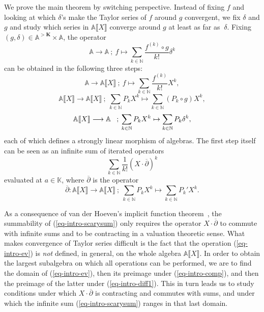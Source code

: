 \documentclass{article}
\newcommand{\of}{:}
\newcommand{\tmem}[1]{{\em #1\/}}
\theoremstyle{remark}\newtheorem*{convention*}{Convention}
\begin{document}
We prove the main theorem by switching perspective. Instead of fixing $f$ and
looking at which $\delta$'s make the Taylor series of $f$ around $g$
convergent, we fix $\delta$ and $g$ and study which series in $\mathbb{A}
\llbracket X \rrbracket$ converge around $g$ at least as far as $\: \delta$.
Fixing $(g, \delta) \in \mathbb{A}^{> \mathbf{K}} \times \mathbb{A}$, the
operator
\[ \mathbb{A} \longrightarrow \mathbb{A} \: ; \: f \mapsto \sum_{k \in
   \mathbb{N}} \frac{f^{(k)} \circ g}{k!} \delta^k \]
can be obtained in the following three steps:
\begin{equation}
  \mathbb{A} \longrightarrow \mathbb{A} \llbracket X \rrbracket \: ; \: f
  \mapsto \sum_{k \in \mathbb{N}} \frac{f^{(k)}}{k!} X^k
  \label{eq-intro-diff1},
\end{equation}
\begin{equation}
  \mathbb{A} \llbracket X \rrbracket \longrightarrow \mathbb{A} \llbracket X
  \rrbracket \: ; \: \sum_{k \in \mathbb{N}} P_k X^k \mapsto \sum_{k \in
  \mathbb{N}} (P_k \circ g) X^k \label{eq-intro-comp},
\end{equation}
\begin{equation}
  \mathbb{A} \llbracket X \rrbracket \longrightarrow \mathbb{A} \hspace{0.8em}
  ; \: \sum_{k \in \mathbb{N}} P_k X^k \mapsto \sum_{k \in \mathbb{N}} P_k
  \delta^k, \label{eq-intro-ev}
\end{equation}
each of which defines a strongly linear morphism of algebras. The first step
itself can be seen as an infinite sum of iterated operators
\begin{equation}
  \sum_{k \in \mathbb{N}} \frac{1}{k!}  (X \cdot \overline{\partial})^k
  \label{eq-intro-scarysum}
\end{equation}
evaluated at $a \in \mathbb{K}$, where $\overline{\partial}$ is the operator
\begin{equation}
  \overline{\partial} \of \mathbb{A} \llbracket X \rrbracket \longrightarrow
  \mathbb{A} \llbracket X \rrbracket \: ; \: \sum_{k \in \mathbb{N}} P_k X^k
  \mapsto \sum_{k \in \mathbb{N}} P_k' X^k . \label{eq-intro-diff2}
\end{equation}


As a consequence of van der Hoeven's implicit function
theorem~{\cite{vdH:noeth}}, the summability of (\ref{eq-intro-scarysum}) only
requires the operator $X \cdot \overline{\partial}$ to commute with infinite
sums and to be contracting in a valuation theoretic sense. What makes
convergence of Taylor series difficult is the fact that the operation
(\ref{eq-intro-ev}) is {\tmem{not}} defined, in general, on the whole algebra
$\mathbb{A} \llbracket X \rrbracket$. In order to obtain the largest
subalgebra on which all operations can be performed, we are to find the domain
of (\ref{eq-intro-ev}), then its preimage under (\ref{eq-intro-comp}), and then
the preimage of the latter under (\ref{eq-intro-diff1}). This in turn leads us
to study conditions under which $X \cdot \overline{\partial}$ is contracting
and commutes with sums, and under which the infinite sum
(\ref{eq-intro-scarysum}) ranges in that last domain.
\end{document}
